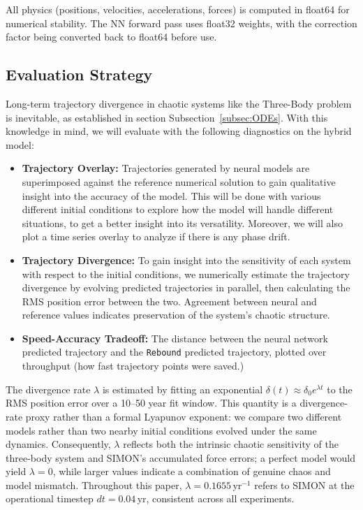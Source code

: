 \documentclass[12pt]{article}
\begin{document}
All physics (positions, velocities, accelerations, forces) is computed in float64 for numerical stability. The NN forward pass uses float32 weights, with the correction factor being converted back to float64 before use.

\subsection{Evaluation Strategy}
\label{sec:eval_strategy}
Long-term trajectory divergence in chaotic systems like the Three-Body problem is inevitable, as established in section Subsection~\ref{subsec:ODEs}. With this knowledge in mind, we will evaluate with the following diagnostics on the hybrid model:

\begin{itemize}
    \item \textbf{Trajectory Overlay:} Trajectories generated by neural models are superimposed against the reference numerical solution to gain qualitative insight into the accuracy of the model. This will be done with various different initial conditions to explore how the model will handle different situations, to get a better insight into its versatility. Moreover, we will also plot a time series overlay to analyze if there is any phase drift.
    \item \textbf{Trajectory Divergence:} To gain insight into the sensitivity of each system with respect to the initial conditions, we numerically estimate the trajectory divergence by evolving predicted trajectories in parallel, then calculating the RMS position error between the two. Agreement between neural and reference values indicates preservation of the system's chaotic structure.
    \item \textbf{Speed-Accuracy Tradeoff:} The distance between the neural network predicted trajectory and the \texttt{Rebound} predicted trajectory, plotted over throughput (how fast trajectory points were saved.)
\end{itemize}

The divergence rate $\lambda$ is estimated by fitting an exponential $\delta(t) \approx \delta_0 e^{\lambda t}$ to the RMS position error over a 10--50 year fit window. This quantity is a divergence-rate proxy rather than a formal Lyapunov exponent: we compare two different models rather than two nearby initial conditions evolved under the same dynamics. Consequently, $\lambda$ reflects both the intrinsic chaotic sensitivity of the three-body system and SIMON's accumulated force errors; a perfect model would yield $\lambda = 0$, while larger values indicate a combination of genuine chaos and model mismatch. Throughout this paper, $\lambda = 0.1655$\,yr$^{-1}$ refers to SIMON at the operational timestep $dt = 0.04$\,yr, consistent across all experiments.
\end{document}

